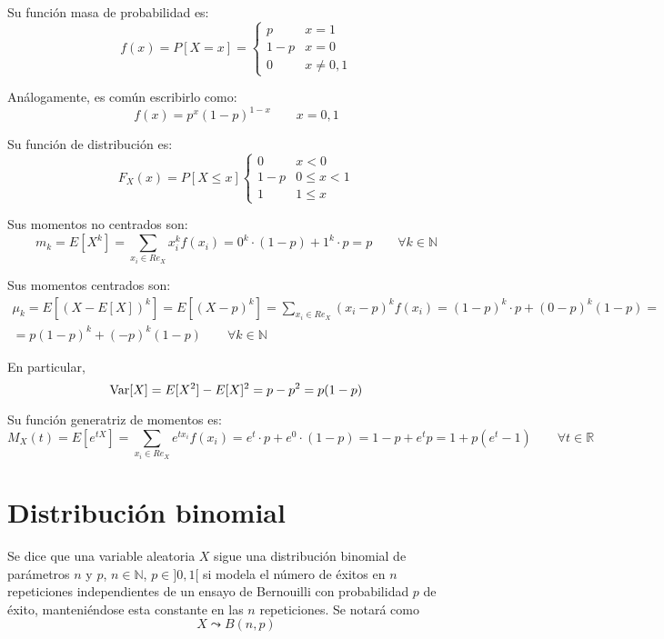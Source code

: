 Su función masa de probabilidad es:
\begin{equation*}
    f(x) = P[X=x] = \left\{\begin{array}{cc}
        p & x=1 \\
        1-p & x=0 \\
        0 & x\neq 0,1
    \end{array}\right.
\end{equation*}

Análogamente, es común escribirlo como:
$$f(x)=p^x (1-p)^{1-x} \qquad x=0,1$$

Su función de distribución es:
\begin{equation*}
    F_X(x) = P[X\leq x] \left\{\begin{array}{cl}
        0 & x<0 \\
        1-p & 0 \leq x < 1 \\
        1 & 1 \leq x
    \end{array}\right.
\end{equation*}

Sus momentos no centrados son:
\begin{equation*}
    m_k = E[X^k]
    = \sum_{x_i\in Re_X}x_i^kf(x_i)
    = 0^k\cdot (1-p) + 1^k\cdot p = p
    \qquad \forall k\in \mathbb{N}
\end{equation*}

Sus momentos centrados son:
\begin{multline*}
    \mu_k = E[(X-E[X])^k]
    = E[(X-p)^k]
    = \sum_{x_i\in Re_X}(x_i-p)^k   f(x_i)
    = (1-p)^k\cdot p + (0-p)^k(1-p) =\\=
    p(1-p)^k + (-p)^k(1-p)    
    \qquad \forall k\in \mathbb{N}
\end{multline*}

En particular,
\begin{equation*}
    \operatorname{Var}[X] = E[X^2] - E[X]^2 = p-p^2 = p(1-p)
\end{equation*}

Su función generatriz de momentos es:
\begin{equation*}
    M_X(t) = E[e^{tX}] = \sum_{x_i\in Re_X}e^{tx_i}f(x_i) = e^t\cdot p + e^0\cdot (1-p) = 1-p +e^tp = 1+p(e^t-1)     
    \qquad \forall t\in \mathbb{R}
\end{equation*}

\section{Distribución binomial}
\begin{definicion}
    Se dice que una variable aleatoria $X$ sigue una distribución binomial de parámetros $n$ y $p$, $n\in \mathbb{N}$, $p\in ]0,1[$ si modela el número de éxitos en $n$ repeticiones independientes de un ensayo de Bernouilli con probabilidad $p$ de éxito, manteniéndose esta constante en las $n$ repeticiones. Se notará como $$X\leadsto B(n,p)$$
\end{definicion}

